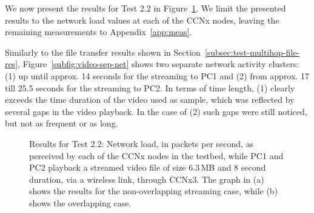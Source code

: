 We now present the results for Test 2.2 in Figure~\ref{fig:video-sep-net}. We 
limit the presented results to the network load values at each of the CCNx 
nodes, leaving the remaining measurements to Appendix~\ref{app:meas}.\vertbreak

Similarly to the file transfer results shown in 
Section~\ref{subsec:test-multihop-file-res}, Figure~\ref{subfig:video-sep-net} 
shows two separate network activity clusters: (1) up until approx. 14 seconds 
for the streaming to PC1 and (2) from approx. 17 till 25.5 seconds for the 
streaming to PC2. In terms of time length, (1) clearly exceeds the time 
duration of the video used as sample, which was reflected by several gaps 
in the video playback. In the case of (2) such gaps were still noticed, but 
not as frequent or as long.\vertbreak

\begin{figure}[h!]
    \centering



    \cprotect\caption{Results for Test 2.2: Network load, in packets per 
        second, as perceived by each of the CCNx nodes in the testbed, 
        while PC1 and PC2 playback a streamed video file of size 6.3\,MB 
        and 8 second duration, via a wireless 
        link, through CCNx3. The graph in (a) shows the results for 
        the non-overlapping streaming case, while (b) shows the 
        overlapping case.}
    \label{fig:video-sep-net}

\end{figure}

